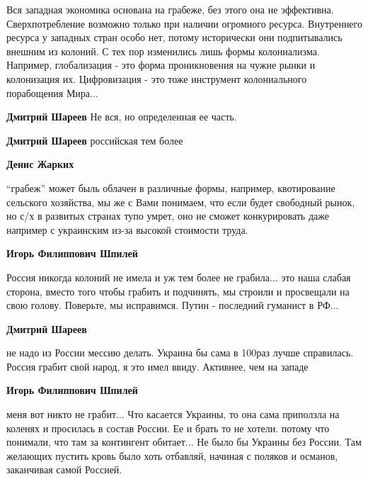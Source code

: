  
 
 
 
 
\zzSecCmt

\begin{itemize} %

Вся западная экономика основана на грабеже, без этого она не эффективна.
Сверхпотребление возможно только при наличии огромного ресурса. Внутреннего
ресурса у западных стран особо нет, потому исторически они подпитывались
внешним из колоний. С тех пор изменились лишь формы колониализма. Например,
глобализация - это форма проникновения на чужие рынки и колонизация их.
Цифровизация - это тоже инструмент колониального порабощения Мира...

\begin{itemize} %
\textbf{Дмитрий Шареев} Не вся, но определенная ее часть.

\textbf{Дмитрий Шареев} российская тем более

\textbf{Денис Жарких} 

\enquote{грабеж} может быль облачен в различные формы, например, квотирование сельского
хозяйства, мы же с Вами понимаем, что если будет свободный рынок, но с/х в
развитых странах тупо умрет, оно не сможет конкурировать даже например с
украинским из-за высокой стоимости труда.

\textbf{Игорь Филиппович Шпилей} 

Россия никогда колоний не имела и уж тем более не грабила... это наша слабая
сторона, вместо того чтобы грабить и подчинять, мы строили и просвещали на свою
голову. Поверьте, мы исправимся. Путин - последний гуманист в РФ...

\textbf{Дмитрий Шареев} 

не надо из России мессию делать. Украина бы сама в 100раз лучше справилась.
Россия грабит свой народ, я это имел ввиду. Активнее, чем на западе

\textbf{Игорь Филиппович Шпилей} 

меня вот никто не грабит... Что касается Украины, то она сама приползла на
коленях и просилась в состав России. Ее и брать то не хотели. потому что
понимали, что там за контингент обитает... Не было бы Украины без России. Там
желающих пустить кровь было хоть отбавляй, начиная с поляков и османов,
заканчивая самой Россией.



\end{itemize}
\end{itemize}
